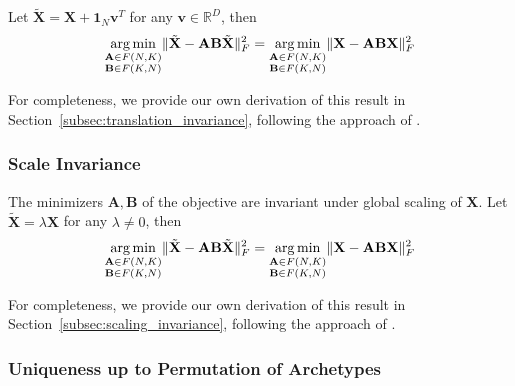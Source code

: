 \documentclass[oneside]{article}
\DeclareMathOperator*{\argmin}{arg\,min}
\begin{document}
Let $\tilde{\mathbf{X}} = \mathbf{X} + \mathbf{1}_N \mathbf{v}^T$ for any $\mathbf{v} \in \mathbb{R}^D$, then
\begin{equation}
    \underset{\begin{subarray}{c} \mathbf{A} \in F(N, K) \\ \mathbf{B} \in F(K, N) \end{subarray}}{\argmin} \| \tilde{\mathbf{X}} - \mathbf{A} \mathbf{B} \tilde{\mathbf{X}} \|_F^2
    =
    \underset{\begin{subarray}{c} \mathbf{A} \in F(N, K) \\ \mathbf{B} \in F(K, N) \end{subarray}}{\argmin} \| \mathbf{X} - \mathbf{A} \mathbf{B} \mathbf{X}\|_F^2
\end{equation}

For completeness, we provide our own derivation of this result in Section~\ref{subsec:translation_invariance}, following the approach of \textcite{morupArchetypalAnalysisMachine2012}.

\subsubsection{Scale Invariance}
\label{subsubsec:scale_invariance}

The minimizers $\mathbf{A}, \mathbf{B}$ of the objective are invariant under global scaling of $\mathbf{X}$. Let $\tilde{\mathbf{X}} = \lambda \mathbf{X}$ for any $\lambda \neq 0$, then
\begin{equation}
    \underset{\begin{subarray}{c} \mathbf{A} \in F(N, K) \\ \mathbf{B} \in F(K, N) \end{subarray}}{\argmin} \| \tilde{\mathbf{X}} - \mathbf{A} \mathbf{B} \tilde{\mathbf{X}} \|_F^2
    =
    \underset{\begin{subarray}{c} \mathbf{A} \in F(N, K) \\ \mathbf{B} \in F(K, N) \end{subarray}}{\argmin} \| \mathbf{X} - \mathbf{A} \mathbf{B} \mathbf{X}\|_F^2
\end{equation}

For completeness, we provide our own derivation of this result in Section~\ref{subsec:scaling_invariance}, following the approach of \textcite{morupArchetypalAnalysisMachine2012}.

\subsubsection{Uniqueness up to Permutation of Archetypes}
\end{document}
